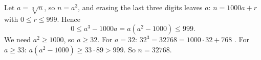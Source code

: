 Let $a=\sqrt[3]{n}$, so $n=a^3$, and erasing the last three digits leaves $a$: $n=1000a+r$ with $0\le r\le999$. Hence
\[0\le a^3-1000a=a(a^2-1000)\le999.\]
We need $a^2\ge1000$, so $a\ge32$. For $a=32$: $32^3=32768=1000\cdot32+768$ \checkmark. For $a\ge33$: $a(a^2-1000)\ge33\cdot89>999$. So $n=\boxed{32768}$.
